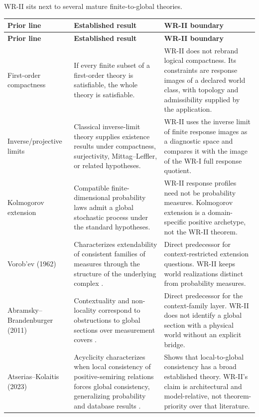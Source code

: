 \documentclass[11pt]{article}
\begin{document}
WR-II sits next to several mature finite-to-global theories.

\begin{longtable}{>{\raggedright\arraybackslash}p{}
                  >{\raggedright\arraybackslash}p{}
                  >{\raggedright\arraybackslash}p{}}
\toprule
\textbf{Prior line} & \textbf{Established result} & \textbf{WR-II boundary}\\
\midrule
\endfirsthead
\toprule
\textbf{Prior line} & \textbf{Established result} & \textbf{WR-II boundary}\\
\midrule
\endhead

First-order compactness &
If every finite subset of a first-order theory is satisfiable, the whole theory
is satisfiable. &
WR-II does not rebrand logical compactness. Its constraints are response images
of a declared world class, with topology and admissibility supplied by the
application. \\[5pt]

Inverse/projective limits &
Classical inverse-limit theory supplies existence results under compactness,
surjectivity, Mittag--Leffler, or related hypotheses. &
WR-II uses the inverse limit of finite response images as a diagnostic space and
compares it with the image of the WR-I full response quotient. \\[5pt]

Kolmogorov extension &
Compatible finite-dimensional probability laws admit a global stochastic
process under the standard hypotheses. &
WR-II response profiles need not be probability measures. Kolmogorov extension
is a domain-specific positive archetype, not the WR-II theorem. \\[5pt]

Vorob'ev (1962) &
Characterizes extendability of consistent families of measures through the
structure of the underlying complex \cite{Vorobev1962}. &
Direct predecessor for context-restricted extension questions. WR-II keeps
world realizations distinct from probability measures. \\[5pt]

Abramsky--Brandenburger (2011) &
Contextuality and non-locality correspond to obstructions to global sections
over measurement covers \cite{AbramskyBrandenburger2011}. &
Direct predecessor for the context-family layer. WR-II does not identify a
global section with a physical world without an explicit bridge. \\[5pt]

Atserias--Kolaitis (2023) &
Acyclicity characterizes when local consistency of positive-semiring relations
forces global consistency, generalizing probability and database results
\cite{AtseriasKolaitis2023}. &
Shows that local-to-global consistency has a broad established theory. WR-II's
claim is architectural and model-relative, not theorem-priority over that
literature. \\[5pt]


\end{longtable}
\end{document}
